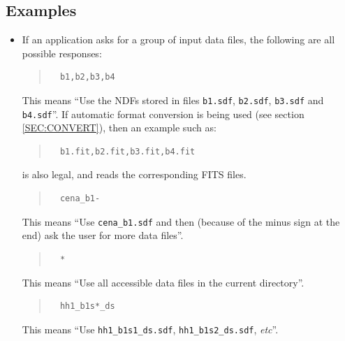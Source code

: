 \documentclass[twoside,11pt]{article}
\newcommand{\hyperref}[4]{#2\ref{#4}#3}
\renewcommand{\_}{\texttt{\symbol{95}}}
\newenvironment{myquote}{\begin{quote}\begin{small}}{\end{small}\end{quote}}
\begin{document}
\subsection{Examples}
\begin{itemize}
\item If an application asks for a group of input data files, the following 
are all possible responses:

\begin{myquote}
\begin{verbatim}
  b1,b2,b3,b4
\end{verbatim}
\end{myquote}
\vspace{-3mm}

This means ``Use the NDFs stored in files \verb+b1.sdf+, \verb+b2.sdf+,
\verb+b3.sdf+ and \verb+b4.sdf+''. If automatic format conversion is being 
used (see \hyperref{here}{section }{}{SEC:CONVERT}), then an example such
as:

\begin{myquote}
\begin{verbatim}
  b1.fit,b2.fit,b3.fit,b4.fit
\end{verbatim}
\end{myquote}

is also legal, and reads the corresponding FITS files.

\begin{myquote}
\begin{verbatim}
  cena_b1-
\end{verbatim}
\end{myquote}
\vspace{-3mm}

This means ``Use \verb+cena_b1.sdf+ and then (because of the minus sign
at the end) ask the user for more data files''.

\begin{myquote}
\begin{verbatim}
  *
\end{verbatim}
\end{myquote}
\vspace{-3mm}
This means ``Use all accessible data files in the current directory''. 

\begin{myquote}
\begin{verbatim}
  hh1_b1s*_ds
\end{verbatim}
\end{myquote}
\vspace{-3mm}
This means ``Use \verb+hh1_b1s1_ds.sdf+, \verb+hh1_b1s2_ds.sdf+, \emph{etc}''.


\end{itemize}
\end{document}
